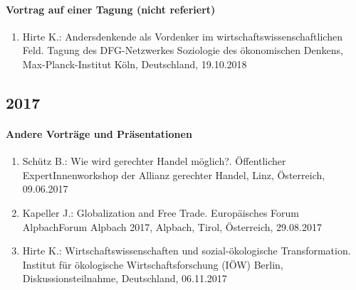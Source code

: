 \paragraph{Vortrag auf einer Tagung (nicht referiert)}
\begin{enumerate}
	\item Hirte K.: Andersdenkende als Vordenker im wirtschaftswissenschaftlichen Feld. Tagung des DFG-Netzwerkes \glqq Soziologie des ökonomischen Denkens\grqq{}, Max-Planck-Institut Köln, Deutschland, 19.10.2018
\end{enumerate}
\subsection*{2017}
\paragraph{Andere Vorträge und Präsentationen}
\begin{enumerate}
	\item Schütz B.: Wie wird gerechter Handel möglich?. Öffentlicher ExpertInnenworkshop der Allianz gerechter Handel, Linz, Österreich, 09.06.2017
	\item Kapeller J.: Globalization and Free Trade. Europäisches Forum AlpbachForum Alpbach 2017, Alpbach, Tirol, Österreich, 29.08.2017
	\item Hirte K.: Wirtschaftswissenschaften und sozial-ökologische Transformation. Institut für ökologische Wirtschaftsforschung (IÖW) Berlin, Diskussionsteilnahme, Deutschland, 06.11.2017
\end{enumerate}
